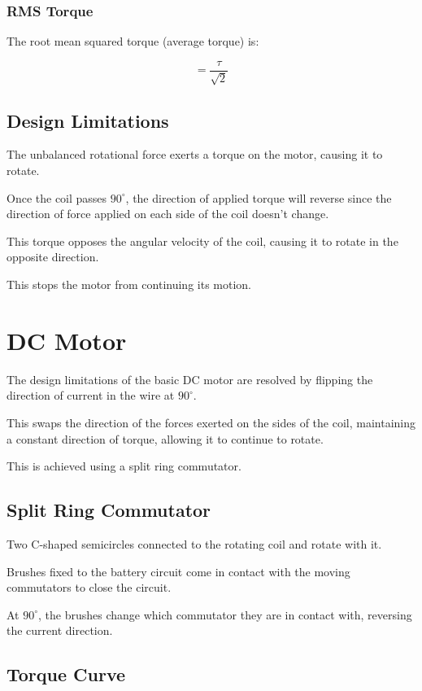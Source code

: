 \documentclass[a4paper,11pt]{article}
\begin{document}
\subsubsection{RMS Torque}

The root mean squared torque (average torque) is:

$$
= \frac{\tau}{\sqrt{2}}
$$


\subsection{Design Limitations}

The unbalanced rotational force exerts a torque on the motor, causing it to
rotate.

Once the coil passes $90^\circ$, the direction of applied torque will reverse
since the direction of force applied on each side of the coil doesn't change.

This torque opposes the angular velocity of the coil, causing it to rotate in
the opposite direction.

This stops the motor from continuing its motion.




\section{DC Motor}

The design limitations of the basic DC motor are resolved by flipping the
direction of current in the wire at $90^\circ$.

This swaps the direction of the forces exerted on the sides of the coil,
maintaining a constant direction of torque, allowing it to continue to rotate.

This is achieved using a split ring commutator.


\subsection{Split Ring Commutator}

Two C-shaped semicircles connected to the rotating coil and rotate with it.

Brushes fixed to the battery circuit come in contact with the moving commutators
to close the circuit.

At $90^\circ$, the brushes change which commutator they are in contact with,
reversing the current direction.


\subsection{Torque Curve}
\end{document}
